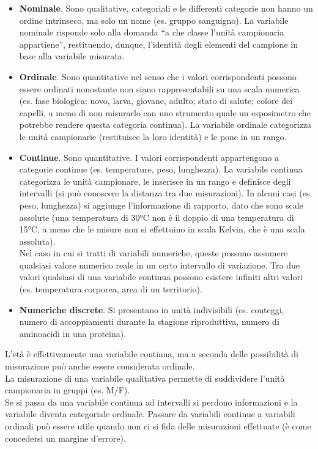 \documentclass[10pt, draft]{book}
\begin{document}
\begin{itemize}
    \item \textbf{Nominale}. Sono qualitative, categoriali e le differenti categorie non hanno un ordine intrinseco, ma solo un nome (es. gruppo sanguigno). La variabile nominale risponde solo alla domanda “a che classe l’unità campionaria appartiene”, restituendo, dunque, l’identità degli elementi del campione in base alla variabile misurata.
    \item \textbf{Ordinale}. Sono quantitative nel senso che i valori corrispondenti possono essere ordinati nonostante non siano rappresentabili su una scala numerica (es. fase biologica: uovo, larva, giovane, adulto; stato di salute; colore dei capelli, a meno di non misurarlo con uno strumento quale un esposimetro che potrebbe rendere questa categoria continua). La variabile ordinale categorizza le unità campionarie (restituisce la loro identità) e le pone in un rango.
    \item \textbf{Continue}. Sono quantitative. I valori corrispondenti appartengono a categorie continue (es. temperature, peso, lunghezza). La variabile continua categorizza le unità campionare, le inserisce in un rango e definisce degli intervalli (si può conoscere la distanza tra due misurazioni). In alcuni casi (es. peso, lunghezza) si aggiunge l’informazione di rapporto, dato che sono scale assolute (una temperatura di 30°C non è il doppio di una temperatura di 15°C, a meno che le misure non si effettuino in scala Kelvin, che è una scala assoluta).
    \\
    Nel caso in cui si tratti di variabili numeriche, queste possono assumere qualsiasi valore numerico reale in un certo intervallo di variazione. Tra due valori qualsiasi di una variabile continua possono esistere infiniti altri valori (es. temperatura corporea, area di un territorio).
    \item \textbf{Numeriche discrete}. Si presentano in unità indivisibili (es. conteggi, numero di accoppiamenti durante la stagione riproduttiva, numero di aminoacidi in una proteina).
\end{itemize}
L’età è effettivamente una variabile continua, ma a seconda delle possibilità di misurazione può anche essere considerata ordinale.
\\
La misurazione di una variabile qualitativa permette di suddividere l’unità campionaria in gruppi (es. M/F).
\\
Se si passa da una variabile continua ad intervalli si perdono informazioni e la variabile diventa categoriale ordinale. Passare da variabili continue a variabili ordinali può essere utile quando non ci si fida delle misurazioni effettuate (è come concedersi un margine d’errore).
\end{document}
